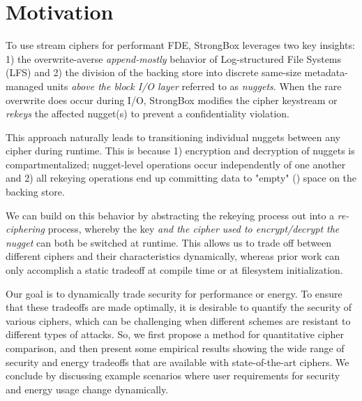 \section{Motivation}\label{sec:motivation}

 To use stream ciphers for performant
FDE, StrongBox leverages two key insights: 1) the overwrite-averse
\emph{append-mostly} behavior of Log-structured File Systems (LFS) and 2) the
division of the backing store into discrete same-size metadata-managed units
\emph{above the block I/O layer} referred to as \emph{nuggets}. When the rare
overwrite does occur during I/O, StrongBox modifies the cipher keystream or
\emph{rekeys} the affected nugget(s) to prevent a confidentiality violation.

This approach naturally leads to transitioning individual nuggets between any
cipher during runtime. This is because 1) encryption and decryption of nuggets
is compartmentalized; nugget-level operations occur independently of one another
and 2) all rekeying operations end up committing data to "empty"
() space on the backing store.

We can build on this behavior by abstracting the rekeying process out into a
\emph{re-ciphering} process, whereby the key \emph{and the cipher used to
encrypt/decrypt the nugget} can both be switched at runtime. This allows us to
trade off between different ciphers and their characteristics dynamically,
whereas prior work can only accomplish a static tradeoff at compile time or
at filesystem initialization.

 Our goal is to dynamically trade security for
performance or energy.  To ensure that these tradeoffs are made optimally, it is
desirable to quantify the security of various ciphers, which can be challenging
when different schemes are resistant to different types of attacks. So, we first
propose a method for quantitative cipher comparison, and then present some
empirical results showing the wide range of security and energy tradeoffs that
are available with state-of-the-art ciphers.  We conclude by discussing example
scenarios where user requirements for security and energy usage change
dynamically.


